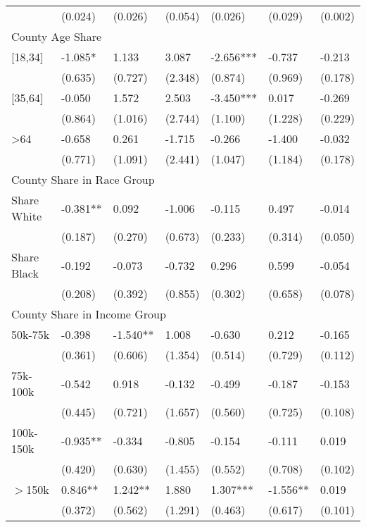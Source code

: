 \documentclass[12pt]{article}
\begin{document}
{\begin{tabular}{lllllll}
													&	(0.024)	& (0.026)	&	(0.054)	&	(0.026)	&	(0.029)	&	(0.002)	\\
\multicolumn{7}{l}{County Age Share}\\
\hspace{0.1in}[18,34]				&	-1.085*	&	1.133	&	3.087	&	-2.656***	&	-0.737	&	-0.213	\\
													&	(0.635)	&	(0.727)	&	(2.348)	&	(0.874)	&	(0.969)	&	(0.178)	\\
\hspace{0.1in}[35,64]				&	-0.050	&	1.572	&	2.503	&	-3.450***	&	0.017	&	-0.269	\\
													&	(0.864)	&	(1.016)	&	(2.744)	&	(1.100)	&	(1.228)	&	(0.229)	\\
\hspace{0.1in} >64	&	-0.658	&	0.261	&	-1.715	&	-0.266	&	-1.400	&	-0.032	\\
													& (0.771)	&	(1.091)	&	(2.441)	&	(1.047)	&	(1.184)	&	(0.178)	\\
\multicolumn{7}{l}{County Share in Race Group}\\
\hspace{0.1in} Share White			&	-0.381**	&	0.092	&	-1.006	&	-0.115	&	0.497	&	-0.014	\\
													&	(0.187)	&	(0.270)	&	(0.673)	&	(0.233)	&	(0.314)	&	(0.050)	\\
\hspace{0.1in} Share Black			&	-0.192	&	-0.073	&	-0.732	&	0.296	&	0.599	&	-0.054	\\
													&	(0.208)	&	(0.392)	&	(0.855)	&	(0.302)	&	(0.658)	&	(0.078)	\\
\multicolumn{7}{l}{County Share in Income Group}\\
\hspace{0.1in}	50k-75k 				&	-0.398	&	-1.540**	&	1.008	&	-0.630	&	0.212	&	-0.165	\\
													&	(0.361)	&	(0.606)	&	(1.354)	&	(0.514)	&	(0.729)	&	(0.112)	\\
\hspace{0.1in} 75k-100k			&	-0.542	&	0.918	&	-0.132	&	-0.499	&	-0.187	&	-0.153	\\
													&	(0.445)	&	(0.721)	&	(1.657)	&	(0.560)	&	(0.725)	&	(0.108)	\\
\hspace{0.1in} 100k-150k			&	-0.935**	&	-0.334	&	-0.805	&	-0.154	&	-0.111	&	0.019	\\
													&	(0.420)	&	(0.630)	&	(1.455)	&	(0.552)	&	(0.708)	&	(0.102)	\\
\hspace{0.1in}$>$150k				&	0.846**	&	1.242**	&	1.880	&	1.307***	&	-1.556**	&	0.019	\\
													&	(0.372)	&	(0.562)	&	(1.291)	&	(0.463)	&	(0.617)	&	(0.101)	\\
\hline
\end{tabular}
}
\end{document}
